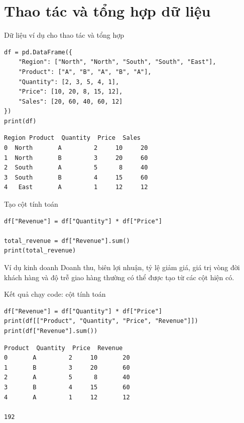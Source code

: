\documentclass[aspectratio=169,11pt]{beamer}
\begin{document}
\section{Thao tác và tổng hợp dữ liệu}

\begin{frame}[fragile]{Dữ liệu ví dụ cho thao tác và tổng hợp}
\small
\begin{lstlisting}[style=py]
df = pd.DataFrame({
    "Region": ["North", "North", "South", "South", "East"],
    "Product": ["A", "B", "A", "B", "A"],
    "Quantity": [2, 3, 5, 4, 1],
    "Price": [10, 20, 8, 15, 12],
    "Sales": [20, 60, 40, 60, 12]
})
print(df)
\end{lstlisting}
\begin{lstlisting}[style=py]
  Region Product  Quantity  Price  Sales
0  North       A         2     10     20
1  North       B         3     20     60
2  South       A         5      8     40
3  South       B         4     15     60
4   East       A         1     12     12
\end{lstlisting}
\end{frame}

\begin{frame}[fragile]{Tạo cột tính toán}
\small
\begin{lstlisting}[style=py]
df["Revenue"] = df["Quantity"] * df["Price"]

total_revenue = df["Revenue"].sum()
print(total_revenue)
\end{lstlisting}
\begin{block}{Ví dụ kinh doanh}
Doanh thu, biên lợi nhuận, tỷ lệ giảm giá, giá trị vòng đời khách hàng và độ trễ giao hàng thường có thể được tạo từ các cột hiện có.
\end{block}
\end{frame}

\begin{frame}[fragile]{Kết quả chạy code: cột tính toán}
\small
\begin{lstlisting}[style=py]
df["Revenue"] = df["Quantity"] * df["Price"]
print(df[["Product", "Quantity", "Price", "Revenue"]])
print(df["Revenue"].sum())
\end{lstlisting}
\begin{lstlisting}[style=py]
  Product  Quantity  Price  Revenue
0       A         2     10       20
1       B         3     20       60
2       A         5      8       40
3       B         4     15       60
4       A         1     12       12

192
\end{lstlisting}
\end{frame}
\end{document}
